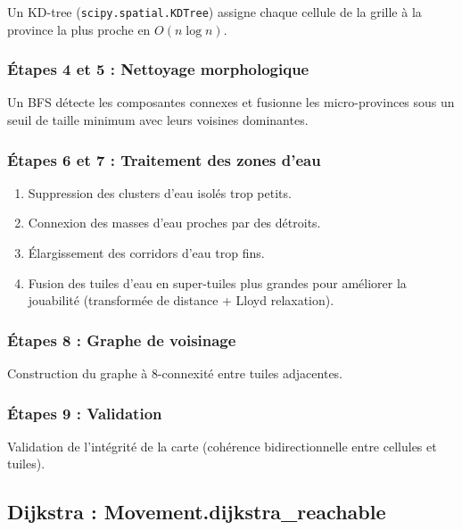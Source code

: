 \documentclass[12pt, a4paper]{article}
\begin{document}
Un KD-tree (\texttt{scipy.spatial.KDTree}) assigne chaque cellule de la grille à la province
la plus proche en $O(n \log n)$.

\subsubsection{Étapes 4 et 5 : Nettoyage morphologique}
Un BFS détecte les composantes connexes et fusionne les micro-provinces sous un seuil de taille
minimum avec leurs voisines dominantes.

\subsubsection{Étapes 6 et 7 : Traitement des zones d'eau}
\begin{enumerate}
    \item Suppression des clusters d'eau isolés trop petits.
    \item Connexion des masses d'eau proches par des détroits.
    \item Élargissement des corridors d'eau trop fins.
    \item Fusion des tuiles d'eau en super-tuiles plus grandes pour améliorer la jouabilité
    (transformée de distance + Lloyd relaxation).
\end{enumerate}

\subsubsection{Étapes 8 : Graphe de voisinage}
Construction du graphe à 8-connexité entre tuiles adjacentes.

\subsubsection{Étapes 9 : Validation}
Validation de l'intégrité de la carte (cohérence bidirectionnelle entre cellules et tuiles).

\subsection{Dijkstra : Movement.dijkstra\_reachable}
\end{document}
